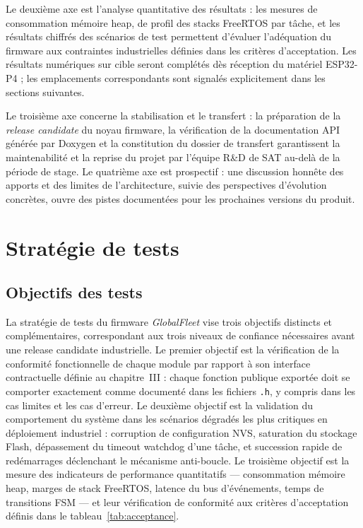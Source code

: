 Le deuxième axe est l'analyse quantitative des résultats : les mesures
de consommation mémoire heap, de profil des stacks FreeRTOS par tâche,
et les résultats chiffrés des scénarios de test permettent d'évaluer
l'adéquation du firmware aux contraintes industrielles définies dans
les critères d'acceptation. Les résultats numériques sur cible seront
complétés dès réception du matériel ESP32-P4 ; les emplacements
correspondants sont signalés explicitement dans les sections suivantes.

Le troisième axe concerne la stabilisation et le transfert : la
préparation de la \textit{release candidate} du noyau firmware, la
vérification de la documentation API générée par Doxygen et la
constitution du dossier de transfert garantissent la maintenabilité
et la reprise du projet par l'équipe R\&D de SAT au-delà de la période
de stage. Le quatrième axe est prospectif : une discussion honnête
des apports et des limites de l'architecture, suivie des perspectives
d'évolution concrètes, ouvre des pistes documentées pour les prochaines
versions du produit.

\section{Stratégie de tests}
\label{sec:test_strat}

\subsection{Objectifs des tests}
\label{subsec:test_obj}

La stratégie de tests du firmware \textit{GlobalFleet} vise trois
objectifs distincts et complémentaires, correspondant aux trois niveaux
de confiance nécessaires avant une release candidate industrielle.
Le premier objectif est la vérification de la conformité fonctionnelle
de chaque module par rapport à son interface contractuelle définie au
chapitre~III : chaque fonction publique exportée doit se comporter
exactement comme documenté dans les fichiers \texttt{.h}, y compris
dans les cas limites et les cas d'erreur. Le deuxième objectif est
la validation du comportement du système dans les scénarios dégradés
les plus critiques en déploiement industriel : corruption de
configuration NVS, saturation du stockage Flash, dépassement du
timeout watchdog d'une tâche, et succession rapide de redémarrages
déclenchant le mécanisme anti-boucle. Le troisième objectif est la
mesure des indicateurs de performance quantitatifs — consommation
mémoire heap, marges de stack FreeRTOS, latence du bus d'événements,
temps de transitions FSM — et leur vérification de conformité aux
critères d'acceptation définis dans le tableau~\ref{tab:acceptance}.

